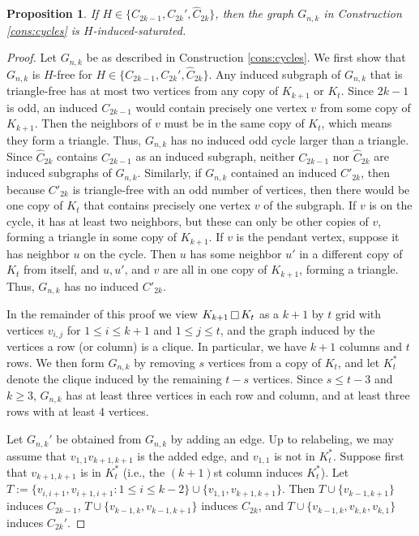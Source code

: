 \documentclass[12pt]{amsart}
\theoremstyle{plain}
\newtheorem{prop}[thm]{Proposition}
\theoremstyle{definition}
\theoremstyle{remark}
\newcommand{\cartprod}{\mathop{\scriptsize\Box}}
\begin{document}
\begin{prop}\label{indsat_cycles}
If $H \in \{C_{2k-1}, C_{2k}', \hat C_{2k}\}$, then the graph $G_{n,k}$ in Construction \ref{cons:cycles} is $H$-induced-saturated.
\end{prop}
\begin{proof}
Let $G_{n,k}$ be as described in Construction \ref{cons:cycles}.  We first show that $G_{n,k}$ is $H$-free for $H \in \{C_{2k-1}, C_{2k}', \hat C_{2k}\}$.  Any induced subgraph of $G_{n,k}$ that is triangle-free has at most two vertices from any copy of $K_{k+1}$ or $K_t$.
Since $2k-1$ is odd, an induced $C_{2k-1}$ would contain precisely one vertex $v$ from some copy of $K_{k+1}$. Then the neighbors of $v$ must be in the same copy of $K_t$, which means they form a triangle. Thus, $G_{n,k}$ has no induced odd cycle larger than a triangle.  Since $\hat C_{2k}$ contains $C_{2k-1}$ as an induced subgraph, neither $C_{2k-1}$ nor $\hat C_{2k}$ are induced subgraphs of $G_{n,k}$.  Similarly, if $G_{n,k}$ contained an induced $C'_{2k}$, then because $C'_{2k}$ is triangle-free with an odd number of vertices, then there would be one copy of $K_t$ that contains precisely one vertex $v$ of the subgraph. If $v$ is on the cycle, it has at least two neighbors, but these can only be other copies of $v$, forming a triangle in some copy of $K_{k+1}$. If $v$ is the pendant vertex, suppose it has neighbor $u$ on the cycle. Then $u$ has some neighbor $u'$ in a different copy of $K_t$ from itself, and $u,u'$, and $v$ are all in one copy of $K_{k+1}$, forming a triangle. Thus, $G_{n,k}$ has no induced $C'_{2k}$.

In the remainder of this proof we view $K_{k+1} \cartprod K_t$ as a $k+1$ by $t$ grid with vertices $v_{i,j}$ for $1 \le i \le k+1$ and $1 \le j \le t$, and the graph induced by the vertices a row (or column) is a clique.  In particular, we have $k+1$ columns and $t$ rows.  We then form $G_{n,k}$ by removing $s$ vertices from a copy of $K_t$, and let $K_t^*$ denote the clique induced by the remaining $t - s$ vertices.
Since $s \le t-3$ and $k \ge 3$, $G_{n,k}$ has at least three vertices in each row and column, and at least three rows with at least 4 vertices.

Let $G_{n,k}'$ be obtained from $G_{n,k}$ by adding an edge.  Up to relabeling, we may assume that $v_{1,1}v_{k+1,k+1}$ is the added edge, and $v_{1,1}$ is not in $K_t^*$.  Suppose first that $v_{k+1,k+1}$ is in $K_t^*$ (i.e., the $(k+1)$st column induces $K_t^*$).  Let $T := \{v_{i,i+1}, v_{i+1,i+1}: 1 \le i \le k-2\} \cup \{v_{1,1}, v_{k+1,k+1}\}$.  Then $T \cup \{v_{k-1,k+1}\}$ induces $C_{2k-1}$, $T \cup  \{v_{k-1,k},v_{k-1,k+1}\}$ induces $\hat C_{2k}$, and $T \cup \{v_{k-1,k}, v_{k,k}, v_{k,1}\}$ induces $C_{2k}'$.


\end{proof}
\end{document}

